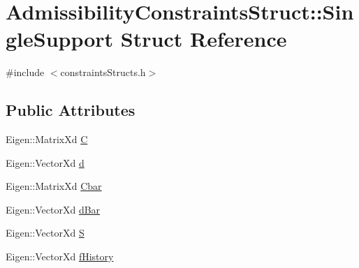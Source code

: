\hypertarget{structAdmissibilityConstraintsStruct_1_1SingleSupport}{\section{\-Admissibility\-Constraints\-Struct\-:\-:\-Single\-Support \-Struct \-Reference}
\label{structAdmissibilityConstraintsStruct_1_1SingleSupport}
}


{\ttfamily \#include $<$constraints\-Structs.\-h$>$}

\subsection*{\-Public \-Attributes}
\begin{DoxyCompactItemize}
\item 
\-Eigen\-::\-Matrix\-Xd \hyperlink{structAdmissibilityConstraintsStruct_1_1SingleSupport_abebf0f46c38b599fd621df82309c13f3}{\-C}
\item 
\-Eigen\-::\-Vector\-Xd \hyperlink{structAdmissibilityConstraintsStruct_1_1SingleSupport_aa0a40e7e0a4f8031dc2bf8e9a2da3344}{d}
\item 
\-Eigen\-::\-Matrix\-Xd \hyperlink{structAdmissibilityConstraintsStruct_1_1SingleSupport_a9443a6065e6f1cd7d54b896269d9da1a}{\-Cbar}
\item 
\-Eigen\-::\-Vector\-Xd \hyperlink{structAdmissibilityConstraintsStruct_1_1SingleSupport_adce7d8739e27981f9b6a61e35c261bef}{d\-Bar}
\item 
\-Eigen\-::\-Vector\-Xd \hyperlink{structAdmissibilityConstraintsStruct_1_1SingleSupport_aff9e7430c1d0bb3b5442bda53bb9c842}{\-S}
\item 
\-Eigen\-::\-Vector\-Xd \hyperlink{structAdmissibilityConstraintsStruct_1_1SingleSupport_ad907835e70c7e9c335435b11e733f34d}{f\-History}
\end{DoxyCompactItemize}


